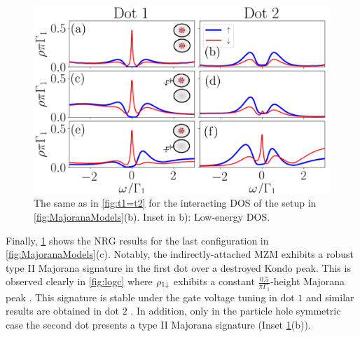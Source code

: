 




\begin{figure}[bt]
    \begin{center}
    \includegraphics[scale=0.41]{IMAGES/NRG/t2>0.png}
    \caption{  \label{fig:Nt2>0} The same as in \ref{fig:t1=t2} for the  interacting DOS of the setup in \ref{fig:MajoranaModels}(b). Inset in b): Low-energy DOS. \protect{}
    }
    \end{center}
    \end{figure}



    Finally, \ref{fig:Nt2>0} shows the NRG results for the last configuration in \ref{fig:MajoranaModels}(c). Notably, the indirectly-attached MZM exhibits a robust type II Majorana signature in the first dot over a destroyed Kondo peak. This is observed clearly in  \ref{fig:logc} where $\rho_{1\downarrow}$ exhibits a constant $\frac{0.5}{\pi \Gamma_1}$-height Majorana peak  . This signature is stable under the gate voltage tuning in dot $1$ and similar results are obtained in dot $2$ . In addition, only  in the particle hole symmetric case the second dot presents a type II Majorana signature (Inset \ref{fig:Nt2>0}(b)). 

